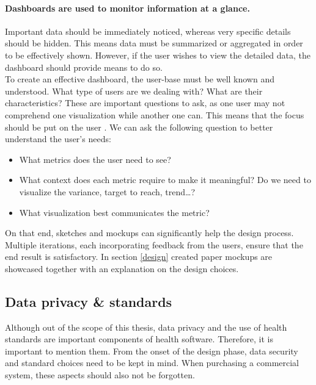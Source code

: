     \paragraph{Dashboards are used to monitor information at a glance.} Important data should be immediately noticed, whereas very specific details should be hidden. This means data must be summarized or aggregated in order to be effectively shown. However, if the user wishes to view the detailed data, the dashboard should provide means to do so.\\

    \noindent To create an effective dashboard, the user-base must be well known and understood. What type of users are we dealing with? What are their characteristics? These are important questions to ask, as one user may not comprehend one visualization while another one can. This means that the focus should be put on the user \cite{brath2004dashboard}. We can ask the following question to better understand the user's needs:
    
    \begin{itemize}
        \item What metrics does the user need to see?
        \item What context does each metric require to make it meaningful? Do we need to visualize the variance, target to reach, trend\ldots?
        \item What visualization best communicates the metric?
    \end{itemize}

    \noindent On that end, sketches and mockups can significantly help the design process. Multiple iterations, each incorporating feedback from the users, ensure that the end result is satisfactory. In section \ref{design} created paper mockups are showcased together with an explanation on the design choices.

    \subsection{Data privacy \& standards}
        
    Although out of the scope of this thesis, data privacy and the use of health standards are important components of health software. Therefore, it is important to mention them. From the onset of the design phase, data security and standard choices need to be kept in mind. When purchasing a commercial system, these aspects should also not be forgotten.

